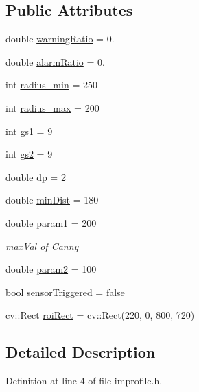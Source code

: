 \subsection*{Public Attributes}
\begin{DoxyCompactItemize}
\item 
double \mbox{\hyperlink{struct_im_profile_a3f88e1cfa11d6b5e9472eb71e64dc041}{warning\+Ratio}} = 0.
\item 
double \mbox{\hyperlink{struct_im_profile_ae22af95683de6b6f10bac5e3b8ed01b4}{alarm\+Ratio}} = 0.
\item 
int \mbox{\hyperlink{struct_im_profile_a6697334a9fbed69e58f11dd5464ae180}{radius\+\_\+min}} = 250
\item 
int \mbox{\hyperlink{struct_im_profile_aca763d3940de1b731fb1dce4531593f5}{radius\+\_\+max}} = 200
\item 
int \mbox{\hyperlink{struct_im_profile_a9fa1622579348c3d0dccebe11c205a29}{gs1}} = 9
\item 
int \mbox{\hyperlink{struct_im_profile_a10bffd53b4e9115dbf0fae545a426bad}{gs2}} = 9
\item 
double \mbox{\hyperlink{struct_im_profile_ae9a7b67e92d0dd3a829a25edd34fbde8}{dp}} = 2
\item 
double \mbox{\hyperlink{struct_im_profile_af5e44df036b18552062e4f9d9f926310}{min\+Dist}} = 180
\item 
double \mbox{\hyperlink{struct_im_profile_a921b476664441309c914b58331ead364}{param1}} = 200
\begin{DoxyCompactList}\small\item\em max\+Val of Canny \end{DoxyCompactList}\item 
double \mbox{\hyperlink{struct_im_profile_ac84186e94a1900eaf9f2a6e1a7ab3014}{param2}} = 100
\item 
bool \mbox{\hyperlink{struct_im_profile_ada7e3e46b79d71e0edcb85cc03d38a51}{sensor\+Triggered}} = false
\item 
cv\+::\+Rect \mbox{\hyperlink{struct_im_profile_ae0436a17c44ab16366c7addf288ec219}{roi\+Rect}} = cv\+::\+Rect(220, 0, 800, 720)
\end{DoxyCompactItemize}


\subsection{Detailed Description}


Definition at line 4 of file improfile.\+h.



